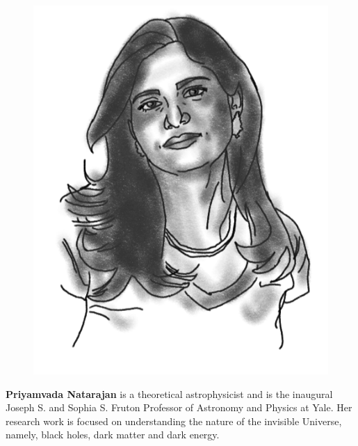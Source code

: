 \begin{figure}
\vspace{-1.7\intextsep}
\includegraphics[width=0.9\linewidth]{portraits/priya.png}
\end{figure}
\textbf{Priyamvada Natarajan}  is a theoretical astrophysicist and is the inaugural Joseph S. and Sophia S. Fruton
Professor of Astronomy and Physics at Yale. Her research work is focused on understanding the nature of the invisible Universe, namely, black holes, dark matter and dark energy.\\
\\

